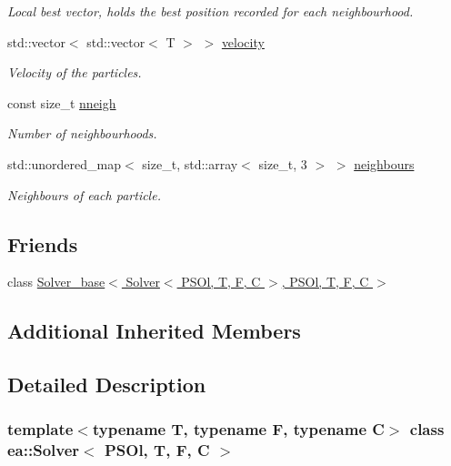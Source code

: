 \begin{DoxyCompactItemize}
\begin{DoxyCompactList}\small\item\em Local best vector, holds the best position recorded for each neighbourhood. \end{DoxyCompactList}\item 
std\+::vector$<$ std\+::vector$<$ T $>$ $>$ \hyperlink{classea_1_1_solver_3_01_p_s_ol_00_01_t_00_01_f_00_01_c_01_4_ae8293610cb6bffc00e0fda749754a1f2}{velocity}
\begin{DoxyCompactList}\small\item\em Velocity of the particles. \end{DoxyCompactList}\item 
const size\+\_\+t \hyperlink{classea_1_1_solver_3_01_p_s_ol_00_01_t_00_01_f_00_01_c_01_4_adb34cfcd87307ee2271b5aa5ffdd779d}{nneigh}
\begin{DoxyCompactList}\small\item\em Number of neighbourhoods. \end{DoxyCompactList}\item 
std\+::unordered\+\_\+map$<$ size\+\_\+t, std\+::array$<$ size\+\_\+t, 3 $>$ $>$ \hyperlink{classea_1_1_solver_3_01_p_s_ol_00_01_t_00_01_f_00_01_c_01_4_ab92e8a0460092b8264bd9023a3455257}{neighbours}
\begin{DoxyCompactList}\small\item\em Neighbours of each particle. \end{DoxyCompactList}\end{DoxyCompactItemize}
\subsection*{Friends}
\begin{DoxyCompactItemize}
\item 
class \hyperlink{classea_1_1_solver_3_01_p_s_ol_00_01_t_00_01_f_00_01_c_01_4_a95bfc162c6509fec9ecb02185ed094d3}{Solver\+\_\+base$<$ Solver$<$ P\+S\+Ol, T, F, C $>$, P\+S\+Ol, T, F, C $>$}
\end{DoxyCompactItemize}
\subsection*{Additional Inherited Members}


\subsection{Detailed Description}
\subsubsection*{template$<$typename T, typename F, typename C$>$\newline
class ea\+::\+Solver$<$ P\+S\+Ol, T, F, C $>$}

